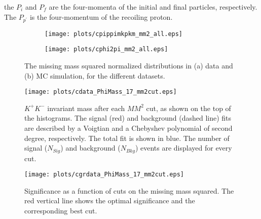 \noindent the $P_i$ and $P_f$ are the four-momenta of the initial and final particles, respectively. The $P_{p^{\prime}}$ is the four-momentum of the recoiling proton.

\begin{figure}[H]
    \centering
    \begin{subfigure}[b]{0.5\textwidth}
        \texttt{[image: plots/cpippimkpkm\_mm2\_all.eps]}
        \caption{}
        \label{fig.evt_sel.mis_mass_sqrt.1.a}
    \end{subfigure}\hfill
    \begin{subfigure}[b]{0.5\textwidth}
        \texttt{[image: plots/cphi2pi\_mm2\_all.eps]}
        \caption{}
        \label{fig.evt_sel.mis_mass_sqrt.1.b}
    \end{subfigure}
    \caption{The missing mass squared normalized distributions in (a) data and (b) MC simulation, for the different datasets.}
    \label{fig.evt_sel.mis_mass_sqrt.1}
\end{figure}

\begin{figure}[H]
    \centering
        \texttt{[image: plots/cdata\_PhiMass\_17\_mm2cut.eps]}
        \caption{$K^+K^-$ invariant mass after each $MM^2$ cut, as shown on the top of the histograms. The signal (red) and background (dashed line) fits are described by a Voigtian and a Chebyshev polynomial of second degree, respectively. The total fit is shown in blue. The number of signal ($N_{Sig}$) and background ($N_{Bkg}$) events are displayed for every cut.}
        \label{fig.evt_sel.mis_mass_sqrt.2}
\end{figure}

\begin{figure}[htbp]
    \centering
        \texttt{[image: plots/cgrdata\_PhiMass\_17\_mm2cut.eps]}
        \caption{Significance as a function of cuts on the missing mass squared. The red vertical line shows the optimal significance and the corresponding best cut.}
        \label{fig.evt_sel.mis_mass_sqrt.3}
\end{figure}
